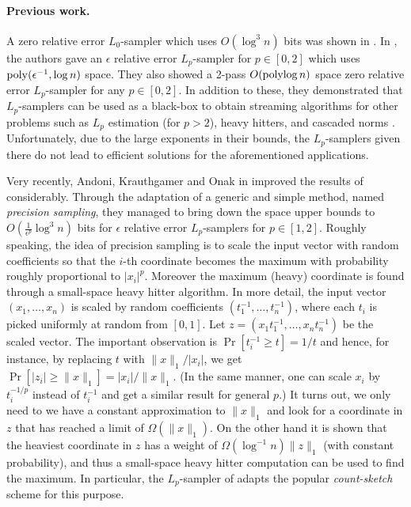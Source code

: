 \paragraph{Previous work.} 
A zero relative error $L_0$-sampler which uses $O(\log^3 n)$
bits was shown in \cite{FrahlingIS2005}. In
\cite{MonemizadehW2010}, the authors gave an $\epsilon$ relative
error $L_p$-sampler for $p \in [0,2]$ which uses
$\operatorname{poly}(\epsilon^{-1},\log n)$ space. They also showed a 2-pass
$O(\operatorname{polylog} n)$ space zero relative error $L_p$-sampler for any
$p\in [0,2]$. In addition to these, they demonstrated that
$L_p$-samplers can be used as a black-box to obtain streaming
algorithms for other problems such as $L_p$ estimation (for $p
>2$), heavy hitters, and cascaded norms \cite{JayramW2009}.
Unfortunately, due to the large exponents in their bounds, the
$L_p$-samplers given there do not lead to efficient solutions
for the aforementioned applications.
  
Very recently, Andoni, Krauthgamer and Onak in \cite{AndoniKO2010}
improved the results of \cite{MonemizadehW2010} considerably.
Through the adaptation of a generic and simple method, named
{\it precision sampling}, they managed to bring down the space
upper bounds to $O(\frac1{\epsilon^p}\log^3 n)$ bits for
$\epsilon$ relative error $L_p$-samplers for $p \in [1,2]$.
Roughly speaking, the idea of precision sampling is to scale the
input vector with random coefficients so that the $i$-th
coordinate becomes the maximum with probability roughly
proportional to $|x_i|^p$. Moreover the maximum (heavy)
coordinate is found through a small-space heavy hitter
algorithm. In more detail, the input vector $(x_1,\ldots,x_n)$
is scaled by random coefficients $(t_1^{-1},\ldots,t_n^{-1})$,
where each $t_i$ is picked uniformly at random from $[0,1]$. Let
$z=(x_1t_1^{-1},\ldots,x_nt_n^{-1})$ be the scaled vector. The
important observation is $\Pr[t_i^{-1} \ge t] =1/t$ and hence,
for instance, by replacing $t$ with $\|x\|_1/|x_i|$, we get
$\Pr[|z_i| \ge \|x\|_1] = |x_i|/\|x\|_1$. (In the same manner,
one can scale $x_i$ by $t_i^{-1/p}$ instead of $t_i^{-1}$ and
get a similar result for general $p$.) It turns out, we only
need to we have a constant approximation to $\|x\|_1$ and look
for a coordinate in $z$ that has reached a limit of
$\Omega(\|x\|_1)$. On the other hand it is shown that the
heaviest coordinate in $z$ has a weight of
$\Omega(\log^{-1}{n})\|z\|_1$ (with constant probability), and
thus a small-space heavy hitter computation can be used to find
the maximum. In particular, the $L_p$-sampler of
\cite{AndoniKO2010} adapts the popular {\it count-sketch} scheme
\cite{CharikarCF2004} for this purpose.

